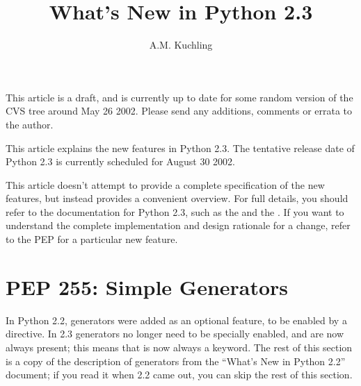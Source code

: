 \documentclass{howto}
\title{What's New in Python 2.3}
\author{A.M. Kuchling}
\begin{document}
\maketitle
\tableofcontents

%
%
%
%
%
%


{\large This article is a draft, and is currently up to date for some
random version of the CVS tree around May 26 2002.  Please send any
additions, comments or errata to the author.}

This article explains the new features in Python 2.3.  The tentative
release date of Python 2.3 is currently scheduled for August 30 2002.

This article doesn't attempt to provide a complete specification of
the new features, but instead provides a convenient overview.  For
full details, you should refer to the documentation for Python 2.3,
such as the
 and the
.  If you want to understand the complete
implementation and design rationale for a change, refer to the PEP for
a particular new feature.


\section{PEP 255: Simple Generators\label{section-generators}}

In Python 2.2, generators were added as an optional feature, to be
enabled by a  directive.  In
2.3 generators no longer need to be specially enabled, and are now
always present; this means that  is now always a
keyword.  The rest of this section is a copy of the description of
generators from the ``What's New in Python 2.2'' document; if you read
it when 2.2 came out, you can skip the rest of this section.
\end{document}
